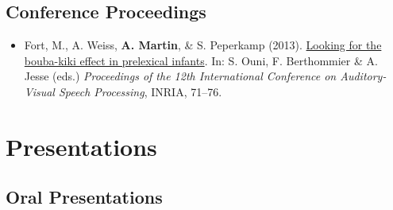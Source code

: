\documentclass[a4paper, 10pt]{article}
\begin{document}
\subsection*{Conference Proceedings}

\begin{itemize}
\RaggedRight

\item Fort, M., A. Weiss, \textbf{A. Martin}, \& S. Peperkamp ({2013}\nobreak\hspace{.05em}). \href{http://avsp2013.loria.fr/proceedings/papers/paper_41.pdf}{Looking
    for the bouba-kiki effect in prelexical infants}.  In: S. Ouni,
  F. Berthommier \& A. Jesse (eds.) \textit{Proceedings of the 12th
    International Conference on Auditory-Visual Speech
    Processing}, INRIA, 71--76.

\end{itemize}


\section*{Presentations}

\subsection*{Oral Presentations}
\end{document}
